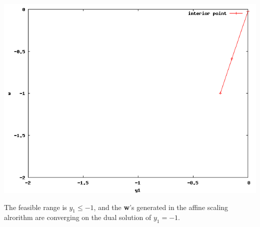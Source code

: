 \documentclass{article}
\begin{document}
\begin{enumerate}
\begin{itemize}
				\includegraphics[width=0.7\linewidth]{1d.png}

				The feasible range is $y_1 \le -1$, and the \textbf{w}'s generated in the affine scaling alrorithm are converging on the dual solution of $y_1 = -1$.
		\end{itemize}


\end{enumerate}
\end{document}
